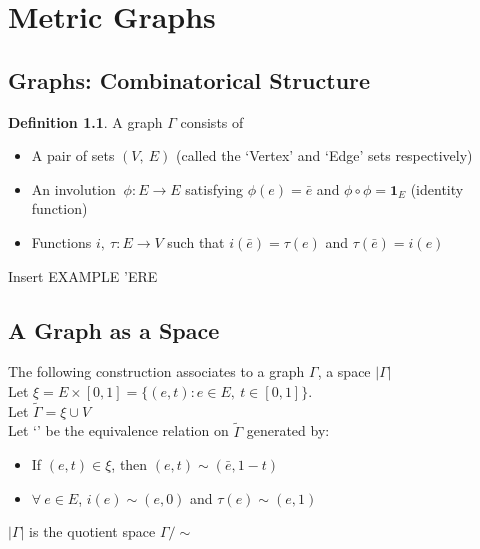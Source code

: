 \documentclass[a4paper,10pt]{book}
\theoremstyle{definition}
\newtheorem{definition}[theorem]{Definition}
\theoremstyle{remark}
\numberwithin{section}{chapter}
\numberwithin{equation}{chapter}
\begin{document}
 
\chapter{Metric Graphs}
 

\section{Graphs: Combinatorical Structure}
 
 
\begin{definition}
  
A graph \emph{$\Gamma$} consists of
  
  
\begin{itemize}
   
\item A pair of sets $(V,\ E)$ (called the `Vertex' and `Edge' sets respectively)
   
\item An involution  $\:\phi \colon E \rightarrow E$ satisfying $\phi (e) = \bar{e} $ and $\phi\circ\phi = \mathbf{1}_E$ (identity function)
  \item Functions $i,\ \tau: E \rightarrow V$ such that $i(\bar{e}) = \tau (e) $ and $\tau(\bar{e}) = i(e)$
  \end{itemize}

 \end{definition}

 Insert EXAMPLE 'ERE
 
 \section{A Graph as a Space}

   The following construction associates to a graph $\Gamma$, a space $| \Gamma |$ 
   \vspace{0.1in} \\ Let $ \xi = E \times [0,1] = \{ (e,t) : e \in E,\ t \in [0,1]\} $.\\
   Let $ \widetilde{\Gamma} =  \xi \cup V $ \\
   Let `\texttildelow' be the equivalence relation on $ \widetilde{\Gamma} $ generated by: 
   \begin{itemize}
      \item If $ (e,t) \in \xi $, then $ (e,t) \sim (\bar{e},1-t) $
      \item $ \forall \ e \in E $, $ i(e) \sim (e,0) $ and $ \tau (e) \sim (e,1) $
   \end{itemize}
   $ |\Gamma| $ is the quotient space $ \Gamma / \sim $
\end{document}
